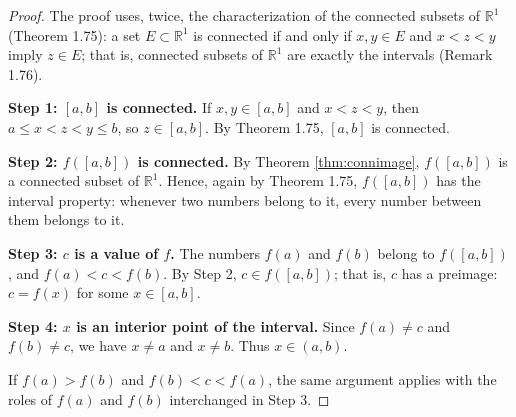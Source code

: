 \documentclass{article}
\theoremstyle{mythm}
\begin{document}
\begin{proof}
The proof uses, twice, the characterization of the connected subsets of $\mathbb{R}^1$ (Theorem 1.75): a set $E \subset \mathbb{R}^1$ is connected if and only if $x, y \in E$ and $x < z < y$ imply $z \in E$; that is, connected subsets of $\mathbb{R}^1$ are exactly the intervals (Remark 1.76).

\textbf{Step 1: $[a,b]$ is connected.} If $x, y \in [a,b]$ and $x < z < y$, then $a \leq x < z < y \leq b$, so $z \in [a,b]$. By Theorem 1.75, $[a,b]$ is connected.

\textbf{Step 2: $f([a,b])$ is connected.} By Theorem \ref{thm:connimage}, $f([a,b])$ is a connected subset of $\mathbb{R}^1$. Hence, again by Theorem 1.75, $f([a,b])$ has the interval property: whenever two numbers belong to it, every number between them belongs to it.

\textbf{Step 3: $c$ is a value of $f$.} The numbers $f(a)$ and $f(b)$ belong to $f([a,b])$, and $f(a) < c < f(b)$. By Step 2, $c \in f([a,b])$; that is, $c$ has a preimage: $c = f(x)$ for some $x \in [a,b]$.

\textbf{Step 4: $x$ is an interior point of the interval.} Since $f(a) \neq c$ and $f(b) \neq c$, we have $x \neq a$ and $x \neq b$. Thus $x \in (a,b)$.

If $f(a) > f(b)$ and $f(b) < c < f(a)$, the same argument applies with the roles of $f(a)$ and $f(b)$ interchanged in Step 3.
\end{proof}
\end{document}
